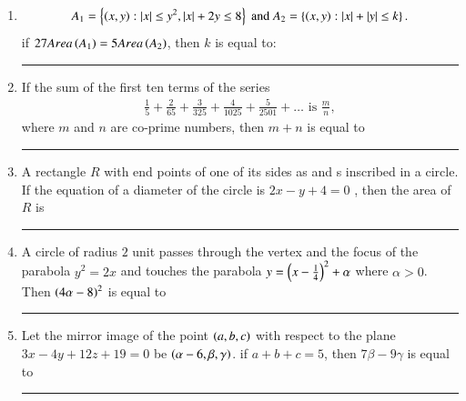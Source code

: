 \documentclass[journal]{IEEEtran}
\numberwithin{equation}{enumi}
\numberwithin{figure}{enumi}
\begin{document}
\begin{enumerate}
    \hfill{}

    \item 
    \begin{align*}
        A_1 = \left\{\left(x,y\right) : \left\vert x\right\vert \leq y^2, \left\vert x\right\vert + 2y \leq 8\right\} 
        \text{ and }
        A_2 = \left\{\left(x,y\right) : \left\vert x\right\vert + \left\vert y\right\vert \leq k\right\}.
    \end{align*}
    if $27Area\left(A_1\right) = 5Area\left(A_2\right)$, then $k$ is equal to: \rule{1cm}{0.1pt}

    \hfill{}

    \item 
    If the sum of the first ten terms of the series 
    \begin{align*}
        \frac{1}{5} + \frac{2}{65} + \frac{3}{325} + \frac{4}{1025} + \frac{5}{2501} + \dots \text{ is } \frac{m}{n},
    \end{align*}
    where $m$ and $n$ are co-prime numbers, then $m + n$ is equal to \rule{1cm}{0.1pt}

    \hfill{}

    \item 
    A rectangle $R$ with end points of one of its sides as  and  s inscribed in a circle. If the equation of a diameter of the circle is  $2x - y + 4 = 0$ , then the area of $R$ is \rule{1cm}{0.1pt}

    \hfill{}

    \item 
    A circle of radius $2$ unit passes through the vertex and the focus of the parabola $y^2 =  2x$ and touches the parabola $y = \left(x-\frac{1}{4}\right)^2 + \alpha$ where $\alpha > 0$. Then $\left(4\alpha - 8\right)^2$ is equal to \rule{1cm}{0.1pt}

    \hfill{}

    \item 
    Let the mirror image of the point $\left(a, b, c\right)$ with respect to the plane $ 3x - 4y + 12z + 19 = 0 $ be $\left(\alpha - 6, \beta, \gamma\right)$. if $a + b + c = 5$, then $7\beta - 9\gamma$ is equal to \rule{1cm}{0.1pt}
    
    \hfill{}
    
\end{enumerate}
\end{document}
